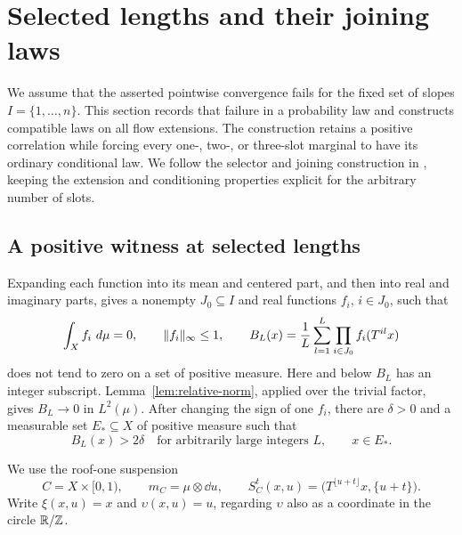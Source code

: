 \section{Selected lengths and their joining laws}\label{sec:selected}

We assume that the asserted pointwise convergence fails for the fixed
set of slopes $I=\{1,\ldots,n\}$.  This section records that failure in
a probability law and constructs compatible laws on all flow extensions.
The construction retains a positive correlation while forcing every
one-, two-, or three-slot marginal to have its ordinary conditional law.
We follow the selector and joining construction in
\cite[Sections~3--6]{FourfoldCompanion}, keeping the extension and
conditioning properties explicit for the arbitrary number of slots.

\subsection{A positive witness at selected lengths}

Expanding each function into its mean and centered part, and then into
real and imaginary parts, gives a nonempty $J_0\subseteq I$ and real
functions $f_i$, $i\in J_0$, such that
\[
  \int_X f_i\,\,d\mu=0,\qquad \lVert f_i\rVert_\infty\le1,
  \qquad
  B_L(x)=\frac1L\sum_{l=1}^L\prod_{i\in J_0}f_i(T^{il}x)
\]
does not tend to zero on a set of positive measure.  Here and below
$B_L$ has an integer subscript.  Lemma~\ref{lem:relative-norm}, applied
over the trivial factor, gives $B_L\to0$ in $L^2(\mu)$.  After changing
the sign of one $f_i$, there are $\delta>0$ and a measurable set
$E_*\subseteq X$ of positive measure such that
\begin{equation}\label{eq:failure-witness}
  B_L(x)>2\delta\quad\text{for arbitrarily large integers }L,
  \qquad x\in E_*.
\end{equation}

We use the roof-one suspension
\begin{equation}\label{eq:suspension}
  C=X\times[0,1),\qquad m_C=\mu\otimes\dd u,
  \qquad
  S_C^t(x,u)=\bigl(T^{\lfloor u+t\rfloor}x,\{u+t\}\bigr).
\end{equation}
Write $\xi(x,u)=x$ and $\upsilon(x,u)=u$, regarding $\upsilon$ also as
a coordinate in the circle $\mathbb R/\mathbb Z$.


